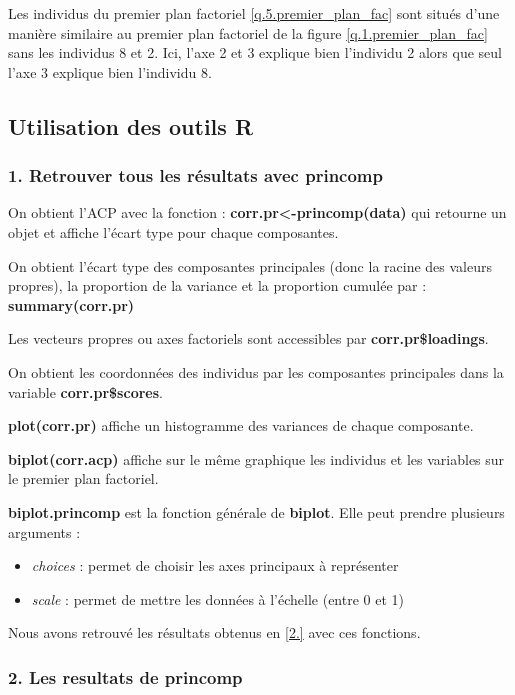 \documentclass{article}
\begin{document}
Les individus du premier plan factoriel \ref{q.5.premier_plan_fac} sont situés d'une manière similaire au premier plan factoriel de la figure \ref{q.1.premier_plan_fac} sans les individus 8 et 2. Ici, l'axe 2 et 3 explique bien l'individu 2 alors que seul l'axe 3 explique bien l'individu 8.


\subsection{Utilisation des outils R}
\subsubsection*{1. Retrouver tous les résultats avec princomp}
On obtient l'ACP avec la fonction : \textbf{corr.pr<-princomp(data)} qui retourne un objet et affiche l'écart type pour chaque composantes.

On obtient l'écart type des composantes principales (donc la racine des valeurs propres), la proportion de la variance et la proportion cumulée par : \textbf{summary(corr.pr)}

Les vecteurs propres ou axes factoriels sont accessibles par \textbf{corr.pr\$loadings}.

On obtient les coordonnées des individus par les composantes principales dans la variable \textbf{corr.pr\$scores}.

\textbf{plot(corr.pr)} affiche un histogramme des variances de chaque composante.

\textbf{biplot(corr.acp)} affiche sur le même graphique les individus et les variables sur le premier plan factoriel.

\textbf{biplot.princomp} est la fonction générale de \textbf{biplot}. Elle peut prendre plusieurs arguments : 
\begin{itemize}
	\item \textit{choices} : permet de choisir les axes principaux à représenter
    \item \textit{scale} : permet de mettre les données à l'échelle (entre 0 et 1)
\end{itemize}

Nous avons retrouvé les résultats obtenus en \ref{2.} avec ces fonctions.


\subsubsection*{2. Les resultats de princomp}
\end{document}
